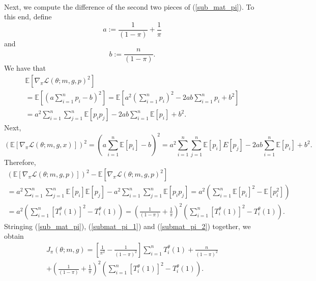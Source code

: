 \documentclass[12pt]{article}
\begin{document}
\begin{appendices}
\begin{refsection}
\begin{multline}
		\end{multline}
		Next, we compute the difference of the second two pieces of (\ref{sub_mat_pi}). To this end, define $$a := \frac{1}{(1-\pi)} + \frac{1}{\pi}$$ and $$b := \frac{n}{(1-\pi)}.$$ We have that
		\begin{multline*}
		\mathbb{E} \left[\nabla_\pi \mathcal{L}(\theta; m, g, p)^2 \right] \\ = \mathbb{E} \left[ \left( a \sum_{i=1}^n p_i - b\right)^2 \right]  =  \mathbb{E} \left[ a^2 \left( \sum_{i=1}^n p_i \right)^2 - 2ab \sum_{i=1}^n p_i + b^2 \right] \\ = a^2 \sum_{i=1}^n \sum_{j=1}^n \mathbb{E}[p_i p_j] -2ab \sum_{i=1}^n \mathbb{E} [p_i] + b^2.
		\end{multline*}
		Next,
		\begin{equation*}
		\left( \mathbb{E} \left[\nabla_\pi \mathcal{L}(\theta; m, g, x) \right] \right)^2 = \left( a \sum_{i=1}^n \mathbb{E} [p_i] - b \right)^2 = a^2 \sum_{i=1}^n \sum_{j=1}^n \mathbb{E}[p_i]  E[p_j] - 2ab \sum_{i=1}^n \mathbb{E}[p_i] + b^2.
		\end{equation*}
		Therefore,
		\begin{multline}\label{submat_pi_2}
		(\mathbb{E} [\nabla_\pi \mathcal{L}(\theta; m, g, p)])^2 - \mathbb{E} \left[\nabla_\pi \mathcal{L}(\theta; m, g, p)^2 \right] \\ = a^2 \sum_{i=1}^n \sum_{j=1}^n \mathbb{E}[p_i] \mathbb{E}[p_j] - a^2 \sum_{i=1}^n \sum_{j=1}^n \mathbb{E}[p_i p_j] = a^2 \left( \sum_{i=1}^n \mathbb{E}[p_i]^2 - \mathbb{E}[p_i^2]\right) \\ = a^2 \left( \sum_{i=1}^n [T^\theta_i(1)]^2 - T^\theta_i(1) \right) = \left( \frac{1}{(1 - \pi)} + \frac{1}{\pi} \right)^2 \left(\sum_{i=1}^n [T^\theta_i(1)]^2 - T^\theta_i(1) \right).
		\end{multline}
		Stringing (\ref{sub_mat_pi}), (\ref{submat_pi_1}) and (\ref{submat_pi_2}) together, we obtain
		\begin{multline}\label{sub_mat_1_formula}
		J_\pi(\theta; m, g) = 
		\left[ \frac{1}{\pi^2} - \frac{1}{(1 - \pi )^2} \right] \sum_{i=1}^n T^\theta_i(1) + \frac{n}{(1-\pi )^2} \\ + \left( \frac{1}{(1 - \pi )} + \frac{1}{\pi} \right)^2 \left( \sum_{i=1}^n [T^\theta_i(1)]^2 - T^\theta_i(1) \right).
		\end{multline}
		

\end{refsection}
\end{appendices}
\end{document}
